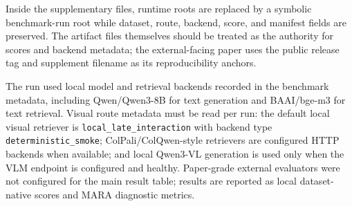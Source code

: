 Inside the supplementary files, runtime roots are replaced by a symbolic benchmark-run root while dataset, route, backend, score, and manifest fields are preserved. The artifact files themselves should be treated as the authority for scores and backend metadata; the external-facing paper uses the public release tag and supplement filename as its reproducibility anchors.

The run used local model and retrieval backends recorded in the benchmark metadata, including Qwen/Qwen3-8B for text generation and BAAI/bge-m3 for text retrieval. Visual route metadata must be read per run: the default local visual retriever is \texttt{local\_late\_interaction} with backend type \texttt{deterministic\_smoke}; ColPali/ColQwen-style retrievers are configured HTTP backends when available; and local Qwen3-VL generation is used only when the VLM endpoint is configured and healthy. Paper-grade external evaluators were not configured for the main result table; results are reported as local dataset-native scores and MARA diagnostic metrics.
